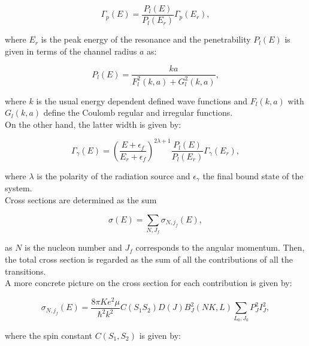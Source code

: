 \documentclass[openany]{book}
\begin{document}
\begin{equation}\label{eq:potential_radiative_width_proton}
	\Gamma_p(E)  = \frac{P_l(E)}{P_l(E_r)}  \Gamma_p(E_r),
\end{equation}

where $E_r$ is the peak energy of the resonance and the penetrability $P_l(E)$ is given in terms of the channel radius $a$ as: 

\begin{equation}\label{eq:potential_radiative_penetrability}
	P_l (E) = \frac{ka}{F^2_l(k, a) + G^2_l(k, a)},
\end{equation}

where $k$ is the usual energy dependent defined wave functions and $F_l(k, a)$ with $G_l(k, a)$ define the Coulomb regular and irregular functions.  \\

On the other hand, the latter width is given by:

\begin{equation}\label{eq:potential_radiative_width_photon}
	\Gamma_\gamma(E)  =  \left(\frac{E + \epsilon_f}{E_r + \epsilon_f}\right)^{2\lambda + 1} \frac{P_l(E)}{P_l(E_r)}  \Gamma_\gamma(E_r),
\end{equation}

where $\lambda$ is the polarity of the radiation source and $\epsilon_\gamma$ the final bound state of the system. \\



Cross sections are determined as the sum 


\begin{equation}\label{eq:potential_radiativeCrossSections}
	\sigma(E) = \sum_{N, J_f} \sigma_{N, j_f} (E),
\end{equation}

as $N$ is the nucleon number and $J_f$ corresponds to the angular momentum. Then, the total cross section is regarded as the sum of all the contributions of all the transitions.\\

A more concrete picture on the cross section for each contribution is given by: 

\begin{equation}\label{eq:potential_radiativeCrossSections_each}
	 \sigma_{N, j_f} (E) = \frac{8\pi K e^2 \mu}{\hbar^2 k^2} C(S_1 S_2) D(J) B^2_J(NK, L) \sum_{L_0, J_0} P^2_{J} I^2_{J} ,
\end{equation}

where the spin constant $C(S_1, S_2)$ is given by: 
\end{document}
